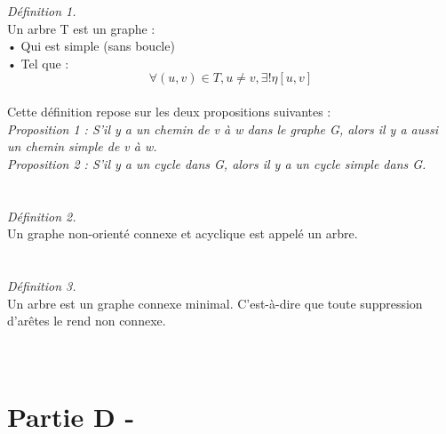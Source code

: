 \documentclass{article}
\begin{document}
\textit{Définition 1.}\\
\textsf{Un arbre T est un graphe :}\\
\textsf{• Qui est simple (sans boucle)}\\
\textsf{• Tel que : }\\
\begin{equation}
\forall (u,v) \in T, u \neq v, \exists! \eta[u,v]
\end{equation}\\
\textsf{Cette définition repose sur les deux propositions suivantes :}\\
\textit{Proposition 1 : S'il y a un chemin de v à w dans le graphe G, alors il y a aussi un chemin simple de v à w.}\\
\textit{Proposition 2 : S'il y a un cycle dans G, alors il y a un cycle simple dans G.}\\\\\\

\textit{Définition 2.}\\
\textsf{Un graphe non-orienté connexe et acyclique est appelé un arbre.}\\\\\\

\textit{Définition 3.}\\
\textsf{Un arbre est un graphe connexe minimal. C'est-à-dire que toute suppression d'arêtes le rend non connexe.}\\\\\\

\section*{Partie D -}
\end{document}
